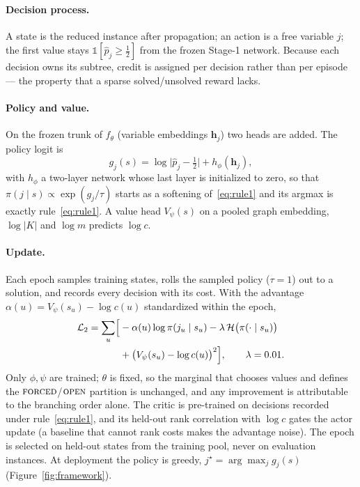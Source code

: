 \documentclass[final,5p,times,twocolumn]{elsarticle}
\newcommand{\FORCED}{\textsc{forced}}
\newcommand{\FREE}{\textsc{open}}
\begin{document}
\paragraph{Decision process.} A state is the reduced instance after propagation; an action is a free variable $j$; the first value stays $\mathbb{1}[\hat p_j\ge\frac12]$ from the frozen Stage-1 network. Because each decision owns its subtree, credit is assigned per decision rather than per episode --- the property that a sparse solved/unsolved reward lacks.

\paragraph{Policy and value.} On the frozen trunk of $f_\theta$ (variable embeddings $\mathbf{h}_j$) two heads are added. The policy logit is
\begin{equation}
g_j(s)=\log\bigl|\hat p_j-\tfrac12\bigr|+h_\phi(\mathbf{h}_j),
\label{eq:policy}
\end{equation}
with $h_\phi$ a two-layer network whose last layer is initialized to zero, so that $\pi(j\mid s)\propto\exp(g_j/\tau)$ starts as a softening of~\eqref{eq:rule1} and its argmax is exactly rule~\eqref{eq:rule1}. A value head $V_\psi(s)$ on a pooled graph embedding, $\log|K|$ and $\log m$ predicts $\log c$.

\paragraph{Update.} Each epoch samples training states, rolls the sampled policy ($\tau=1$) out to a solution, and records every decision with its cost. With the advantage $\alpha(u)=V_\psi(s_u)-\log c(u)$ standardized within the epoch,
\begin{equation}
\begin{split}
\mathcal{L}_2=\sum_u\Bigl[&-\alpha(u)\log\pi(j_u\mid s_u)-\lambda\,\mathcal{H}\bigl(\pi(\cdot\mid s_u)\bigr)\\
&+\bigl(V_\psi(s_u)-\log c(u)\bigr)^2\Bigr],\qquad\lambda=0.01.
\end{split}
\label{eq:loss2}
\end{equation}
Only $\phi,\psi$ are trained; $\theta$ is fixed, so the marginal that chooses values and defines the $\FORCED$/$\FREE$ partition is unchanged, and any improvement is attributable to the branching order alone. The critic is pre-trained on decisions recorded under rule~\eqref{eq:rule1}, and its held-out rank correlation with $\log c$ gates the actor update (a baseline that cannot rank costs makes the advantage noise). The epoch is selected on held-out states from the training pool, never on evaluation instances. At deployment the policy is greedy, $j^\star=\arg\max_j g_j(s)$ (Figure~\ref{fig:framework}).
\end{document}
